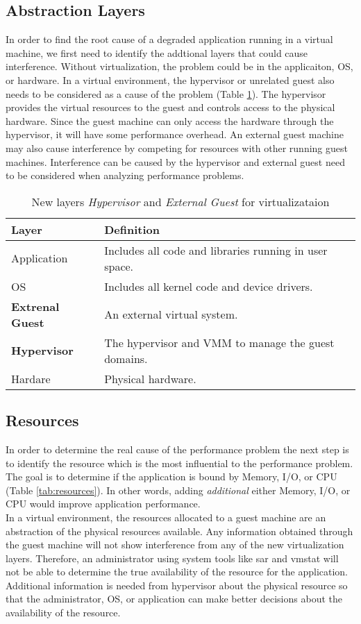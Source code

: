 \subsection{Abstraction Layers}
In order to find the root cause of a degraded application running in a virtual machine, we first need to identify the addtional layers that could cause interference. Without virtualization, the problem could be in the applicaiton, OS, or hardware.  In a virtual environment, the hypervisor or unrelated guest also needs to be considered as a cause of the problem (Table \ref{tab:layers}).  The hypervisor provides the virtual resources to the guest and controls access to the physical hardware.  Since the guest machine can only access the hardware through the hypervisor, it will have some performance overhead. An external guest machine may also cause interference by competing for resources with other running guest machines.  Interference can be caused by the hypervisor and external guest need to be considered when analyzing performance problems.

\begin{table}
\begin{tabular}{ l p{10cm} }
  Layer & Definition \\
  \hline
  Application & Includes all code and libraries running in user space. \\
  OS & Includes all kernel code and device drivers. \\
  \textbf{Extrenal Guest} & An external virtual system. \\
  \textbf{Hypervisor} & The hypervisor and VMM to manage the guest domains. \\
  Hardare & Physical hardware. \\
  \hline
\end{tabular}
\caption{New layers \emph{Hypervisor} and \emph{External Guest} for virtualizataion}
\label{tab:layers}
\end{table}

\subsection{Resources}
In order to determine the real cause of the performance problem the next step is to identify the resource which is the most influential to the performance problem.  
The goal is to determine if the application is bound by Memory, I/O, or CPU (Table \ref{tab:resources}).  In other words, adding \emph{additional} either Memory, I/O, or CPU would improve application performance. \\
\indent In a virtual environment, the resources allocated to a guest machine are an abstraction of the physical resources available.  
Any information obtained through the guest machine will not show interference from any of the new virtualization layers.  
Therefore, an administrator using system tools like sar and vmstat will not be able to determine the true availability of the resource for the application.  
Additional information is needed from hypervisor about the physical resource so that the administrator, OS, or application can make better decisions about the availability of the resource. 

